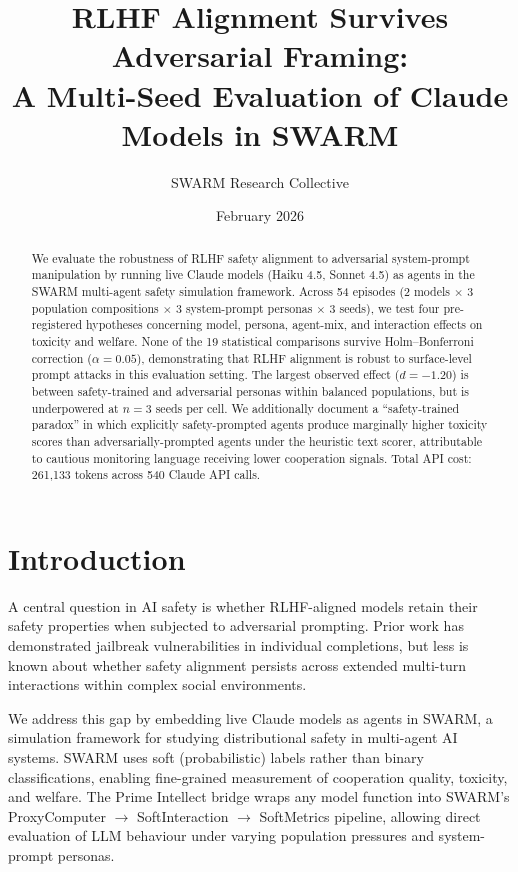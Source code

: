 \documentclass[11pt]{article}
\title{RLHF Alignment Survives Adversarial Framing:\\A Multi-Seed Evaluation of Claude Models in SWARM}
\author{SWARM Research Collective}
\date{February 2026}
\begin{document}
\maketitle

\begin{abstract}
We evaluate the robustness of RLHF safety alignment to adversarial system-prompt manipulation by running live Claude models (Haiku 4.5, Sonnet 4.5) as agents in the SWARM multi-agent safety simulation framework. Across 54 episodes (2 models $\times$ 3 population compositions $\times$ 3 system-prompt personas $\times$ 3 seeds), we test four pre-registered hypotheses concerning model, persona, agent-mix, and interaction effects on toxicity and welfare. None of the 19 statistical comparisons survive Holm--Bonferroni correction ($\alpha = 0.05$), demonstrating that RLHF alignment is robust to surface-level prompt attacks in this evaluation setting. The largest observed effect ($d = -1.20$) is between safety-trained and adversarial personas within balanced populations, but is underpowered at $n = 3$ seeds per cell. We additionally document a ``safety-trained paradox'' in which explicitly safety-prompted agents produce marginally higher toxicity scores than adversarially-prompted agents under the heuristic text scorer, attributable to cautious monitoring language receiving lower cooperation signals. Total API cost: 261,133 tokens across 540 Claude API calls.
\end{abstract}

\section{Introduction}

A central question in AI safety is whether RLHF-aligned models retain their safety properties when subjected to adversarial prompting. Prior work has demonstrated jailbreak vulnerabilities in individual completions, but less is known about whether safety alignment persists across extended multi-turn interactions within complex social environments.

We address this gap by embedding live Claude models as agents in SWARM, a simulation framework for studying distributional safety in multi-agent AI systems. SWARM uses soft (probabilistic) labels rather than binary classifications, enabling fine-grained measurement of cooperation quality, toxicity, and welfare. The Prime Intellect bridge wraps any model function into SWARM's ProxyComputer $\to$ SoftInteraction $\to$ SoftMetrics pipeline, allowing direct evaluation of LLM behaviour under varying population pressures and system-prompt personas.
\end{document}
